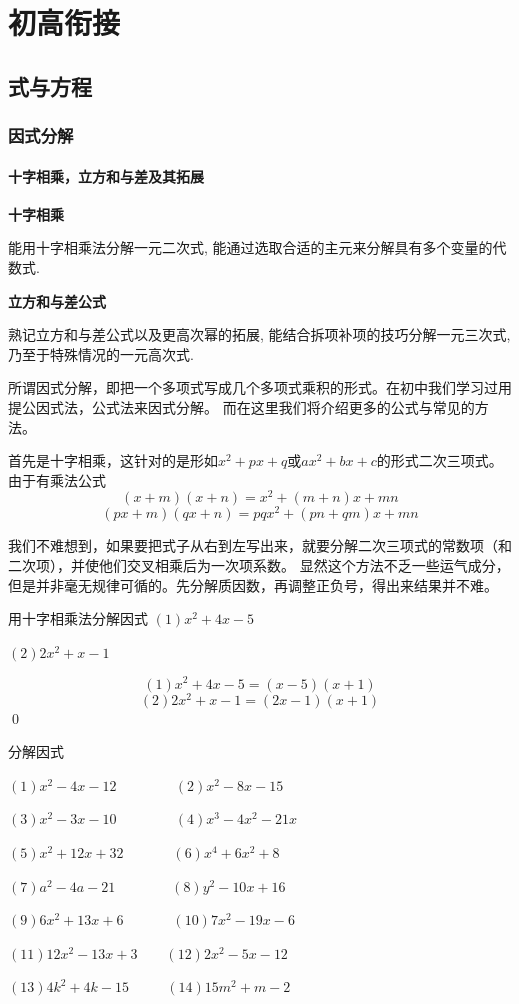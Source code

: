 \part{初高衔接}
\chapter{式与方程}

\section{因式分解}
\subsection{十字相乘，立方和与差及其拓展}
\begin{know}
\item \textbf{十字相乘}

能用十字相乘法分解一元二次式,
能通过选取合适的主元来分解具有多个变量的代数式.

\item \textbf{立方和与差公式}

熟记立方和与差公式以及更高次幂的拓展, 能结合拆项补项的技巧分解一元三次式, 
乃至于特殊情况的一元高次式.
\end{know}

所谓因式分解，即把一个多项式写成几个多项式乘积的形式。在初中我们学习过用提公因式法，公式法来因式分解。
而在这里我们将介绍更多的公式与常见的方法。

首先是十字相乘，这针对的是形如$x^2+px+q$或$ax^2+bx+c$的形式二次三项式。由于有乘法公式
\[(x+m)(x+n)=x^2+(m+n)x+mn\]
\[(px+m)(qx+n)=pqx^2+(pn+qm)x+mn\]

我们不难想到，如果要把式子从右到左写出来，就要分解二次三项式的常数项（和二次项），并使他们交叉相乘后为一次项系数。
显然这个方法不乏一些运气成分，但是并非毫无规律可循的。先分解质因数，再调整正负号，得出来结果并不难。
\begin{example}
用十字相乘法分解因式
 $(1)x^2+4x-5$

 $(2)2x^2+x-1$
\end{example}
\begin{jie}
    
\[(1)x^2+4x-5=(x-5)(x+1)\]
\[(2)2x^2+x-1=(2x-1)(x+1)\]
\qed 
\end{jie}

\begin{exercise}
\label{exer:exercise1.1.1}
    分解因式
\par$(1)x^2-4x-12$\qquad\ \ \ \ \ \ \ \ \,$(2)x^2-8x-15$
\par$(3)x^2-3x-10$\qquad\ \ \ \ \ \ \ \ \,$(4)x^3-4x^2-21x$
\par$(5)x^2+12x+32$\qquad\ \ \ \ \ \ \ $(6)x^4+6x^2+8$
\par$(7)a^2-4a-21$\qquad\ \ \ \ \ \ \ \, $(8)y^2-10x+16$
\par$(9)6x^2+13x+6$\qquad\ \ \ \ \ \ \ $(10)7x^2-19x-6$
\par$(11)12x^2-13x+3$\qquad\ \ \ \ $(12)2x^2-5x-12$
\par$(13)4k^2+4k-15$\qquad\ \ \ \ \ \,$(14)15m^2+m-2$

\end{exercise}

